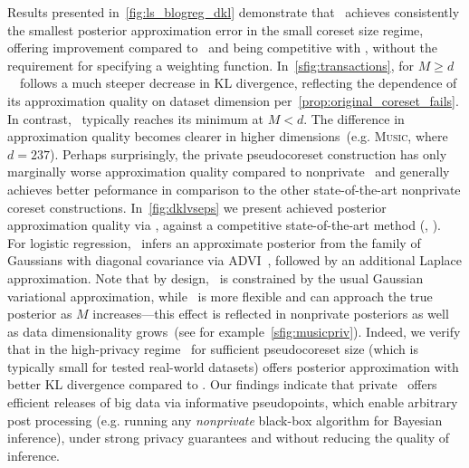 Results presented in~\cref{fig:ls_blogreg_dkl} demonstrate that \psvi~achieves consistently the smallest posterior approximation error in the small coreset size regime, offering improvement
compared to \sparsevi~and being competitive with \gigao,
without the requirement for specifying a weighting function. In~\cref{sfig:transactions}, for $M \geq d$ ~\gigao~follows a much steeper decrease in KL divergence, reflecting the dependence of its approximation quality on dataset dimension per~\cref{prop:original_coreset_fails}. In contrast, \psvi~typically reaches its minimum at $M<d$. The difference in approximation quality becomes clearer in higher dimensions~(e.g. \textsc{Music}, where $d=237$). Perhaps surprisingly, the private pseudocoreset construction has only marginally worse approximation quality compared to nonprivate \psvi~and generally achieves better peformance in comparison to the other state-of-the-art nonprivate coreset constructions. 
In~\cref{fig:dklvseps} we present achieved posterior approximation quality via \dpsvi, against a competitive state-of-the-art method 
(\dpvi, \cite{jalko17}). For logistic regression, \dpvi~infers an approximate posterior from the family of Gaussians with diagonal covariance via ADVI~\citep{kucukelbir17}, followed by an additional Laplace approximation. Note that by design, \dpvi~is constrained by the usual Gaussian variational approximation, while \dpsvi~is more flexible and can approach the true posterior as $ M $ increases---this effect is reflected in nonprivate posteriors as well as data dimensionality grows~(see for example~\cref{sfig:musicpriv}). Indeed, we verify that in the high-privacy regime \dpsvi~for sufficient pseudocoreset size (which is typically small for tested real-world datasets) offers posterior approximation with better KL divergence compared to \dpvi. Our findings indicate that private \psvi~offers efficient releases of big data via informative pseudopoints, which enable arbitrary post processing (e.g. running any \emph{nonprivate} black-box algorithm for Bayesian inference), under strong privacy guarantees and without reducing the quality of inference.







